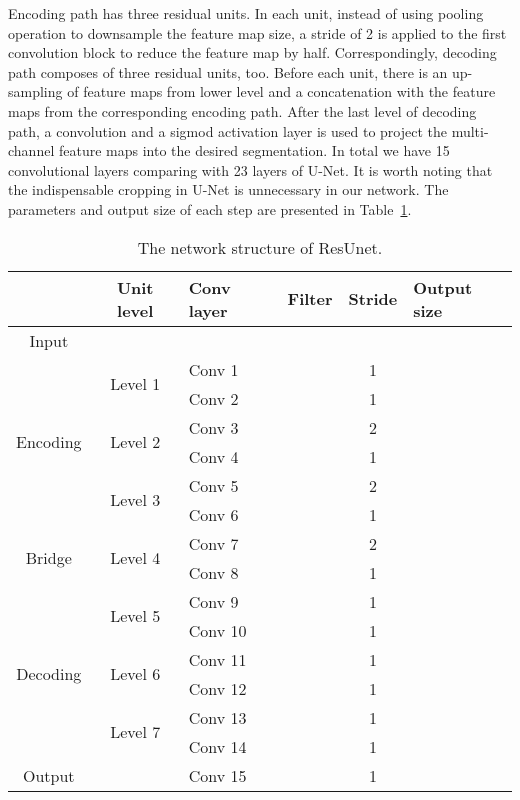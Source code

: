 \documentclass[journal]{IEEEtran}
\begin{document}
Encoding path has three residual units. In each unit, instead of using pooling operation to downsample the feature map size, a stride of 2 is applied to the first convolution block to reduce the feature map by half. Correspondingly, decoding path composes of three residual units, too. Before each unit, there is an up-sampling of feature maps from lower level and a concatenation with the feature maps from the corresponding encoding path. After the last level of decoding path, a  convolution and a sigmod activation layer is used to project the multi-channel feature maps into the desired segmentation. In total we have 15 convolutional layers comparing with 23 layers of U-Net. It is worth noting that the indispensable cropping in U-Net is unnecessary in our network. The parameters and output size of each step are presented in Table~\ref{Table:Feature Size}. 

\begin{table}[!htb]
	\tiny
	\centering
	\caption{The network structure of ResUnet.}	
	\label{Table:Feature Size}	
	\begin{tabular}{ccllcl}
		\hline
		\hline
		& Unit level  & Conv layer & Filter  & Stride &  Output size\\
		\hline
		Input                      &        &     &   &    &   \\
		\hline	
		\multirow{6}{*}{Encoding}
		& \multirow{2}{*}{Level 1}& Conv 1  &  & 1 &   \\
		&        & Conv 2  &   & 1 &   \\
		\cline{2-6}			
		& \multirow{2}{*}{Level 2}& Conv 3  &   & 2 &   \\
		&        & Conv 4  &   & 1 &   \\
		\cline{2-6}
		& \multirow{2}{*}{Level 3}& Conv 5  &   & 2 &   \\
		&        & Conv 6  &   & 1 &   \\
		\cline{2-6}						
		\hline
		\multirow{2}{*}{Bridge}
		&\multirow{2}{*}{Level 4}         &Conv 7  &   & 2 &   \\
		&	      &Conv 8 &   & 1 &  \\
		\hline
		\multirow{6}{*}{Decoding}	
		& \multirow{2}{*}{Level 5} &Conv 9 &   & 1 &   \\
		&        &Conv 10 &   & 1 &  \\
		\cline{2-6}
		& \multirow{2}{*}{Level 6} &Conv 11 &   & 1 &   \\
		&        &Conv 12 &   & 1 &   \\
		\cline{2-6}			
		& \multirow{2}{*}{Level 7} &Conv 13 &   & 1 &    \\
		&        &Conv 14 &   & 1 &   \\
		\hline
		Output                      &        &Conv 15 &   & 1 &   \\		
		\hline
		\hline
	\end{tabular}
	\vspace{-0.6cm}
\end{table}
\end{document}
